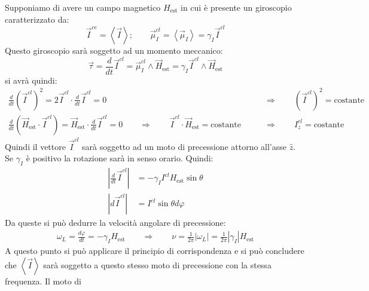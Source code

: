 Supponiamo di avere un campo magnetico $H_\text{est}$ in cui è presente un giroscopio caratterizzato da:
\begin{equation}
\vec{I}^{ce} = \left\langle \vec{I} \right\rangle; \qquad \vec{\mu}_I^{cl} = \left\langle \vec{\mu}_I \right\rangle = \gamma_I \vec{I}^{cl}
\end{equation}
Questo giroscopio sarà soggetto ad un momento meccanico:
\begin{equation}
\vec{\tau} = \frac{d}{dt}\vec{I}^{cl} = \vec{\mu}_I^{cl} \wedge \vec{H}_\text{est} = \gamma_I \vec{I}^{cl} \wedge \vec{H}_\text{est}
\end{equation}
si avrà quindi:
\begin{equation}\begin{split}
\frac{d}{dt} (\vec{I}^{cl})^{2} = 2 \vec{I}^{cl} \cdot \frac{d}{dt} \vec{I}^{cl} = 0 \qquad &\Rightarrow \qquad (\vec{I}^{cl})^{2} = \text{costante}\\
\frac{d}{dt} (\vec{H}_\text{est} \cdot \vec{I}^{cl}) = \vec{H}_\text{est} \cdot \frac{d}{dt} \vec{I}^{cl} = 0 \qquad \Rightarrow \qquad \vec{I}^{cl} \cdot \vec{H}_\text{est} = \text{costante} \qquad &\Rightarrow \qquad I_z^{cl} = \text{costante}
\end{split}\end{equation}
Quindi il vettore $\vec{I}^{cl}$ sarà soggetto ad un moto di precessione attorno all'asse $\hat{z}$. Se $\gamma_I$ è positivo la rotazione sarà in senso orario. Quindi:
\begin{equation}
\begin{split}
\left| \frac{d}{dt} \vec{I}^{cl} \right| &= - \gamma_I I^{cl}H_\text{est} \sin \theta\\
\left| d \vec{I}^{cl} \right| &= I^{cl} \sin \theta d\varphi
\end{split}
\end{equation}
Da queste si può dedurre la velocità angolare di precessione:
\begin{equation}
\begin{split}
\omega_L = \frac{d \varphi}{dt} = - \gamma_I H_\text{est} \qquad \Rightarrow \qquad \nu = \frac{1}{2 \pi} \left|\omega_L \right| = \frac{1}{2 \pi} \left| \gamma_I \right| H_\text{est}
\end{split}
\end{equation}
A  questo punto si può applicare il principio di
corrispondenza e si può concludere che $\left\langle \vec{I} \right\rangle$ sarà
soggetto a questo stesso moto di precessione con la stessa frequenza. Il moto di
